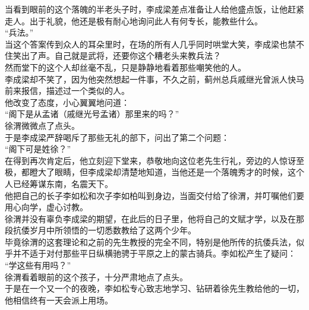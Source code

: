\begin{multicols}{\theparacolNo}
当看到眼前的这个落魄的半老头子时，李成梁差点准备让人给他盛点饭，让他赶紧走人。出于礼貌，他还是极有耐心地询问此人有何专长，能教些什么。\\

“兵法。”\\

当这个答案传到众人的耳朵里时，在场的所有人几乎同时哄堂大笑，李成梁也禁不住笑出了声。自己就是武将，还要你这个糟老头来教兵法？\\

然而堂下的这个人却丝毫不乱，只是静静地看着那些嘲笑他的人。\\

李成梁却不笑了，因为他突然想起一件事，不久之前，蓟州总兵戚继光曾派人快马前来报信，描述过一个类似的人。\\

他改变了态度，小心翼翼地问道：\\

“阁下是从孟诸（戚继光号孟诸）那里来的吗？”\\

徐渭微微点了点头。\\

于是李成梁严辞喝斥了那些无礼的部下，问出了第二个问题：\\

“阁下可是姓徐？”\\

在得到再次肯定后，他立刻迎下堂来，恭敬地向这位老先生行礼，旁边的人惊讶至极，都瞪大了眼睛，但李成梁却清楚地知道，当他还是一个落魄秀才的时候，这个人已经筹谋东南，名震天下。\\

他把自己的长子李如松和次子李如柏叫到身边，当面交付给了徐渭，并叮嘱他们要用心向学，虚心讨教。\\

徐渭并没有辜负李成梁的期望，在此后的日子里，他将自己的文赋才学，以及在那段抗倭岁月中所领悟的一切悉数教给了这两个少年。\\

毕竟徐渭的这套理论和之前的先生教授的完全不同，特别是他所传的抗倭兵法，似乎并不适于对付那些平日纵横驰骋于平原之上的蒙古骑兵。李如松产生了疑问：\\

“学这些有用吗？”\\

徐渭看着眼前的这个孩子，十分严肃地点了点头。\\

于是在一个又一个的夜晚，李如松专心致志地学习、钻研着徐先生教给他的一切，他相信终有一天会派上用场。\\


\end{multicols}
